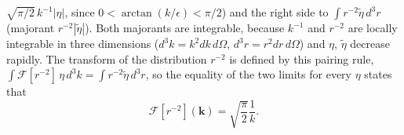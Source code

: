 $\sqrt{\pi/2}\,k^{-1}|\eta|$, since $0<\arctan(k/\epsilon)<\pi/2$)
and the right side to $\int r^{-2}\tilde\eta\,d^3r$ (majorant
$r^{-2}|\tilde\eta|$). Both majorants are integrable, because
$k^{-1}$ and $r^{-2}$ are locally integrable in three dimensions
($d^3k=k^2dk\,d\Omega$, $d^3r=r^2dr\,d\Omega$) and $\eta$,
$\tilde\eta$ decrease rapidly. The transform of the distribution
$r^{-2}$ is defined by this pairing rule,
$\int\mathcal F[r^{-2}]\,\eta\,d^3k=\int r^{-2}\tilde\eta\,d^3r$, so
the equality of the two limits for every $\eta$ states that
\[
\boxed{\mathcal F[r^{-2}](\mathbf k)
=\sqrt{\frac\pi2}\frac1k}.
\]

